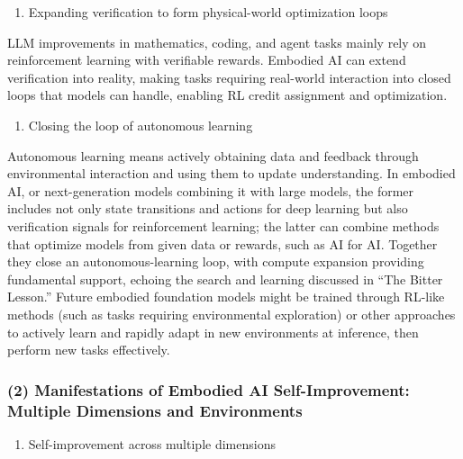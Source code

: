 \begin{enumerate}
\def\labelenumi{\arabic{enumi}.}
\setcounter{enumi}{2}
\tightlist
\item
  Expanding verification to form physical-world optimization loops
\end{enumerate}

LLM improvements in mathematics, coding, and agent tasks mainly rely on reinforcement learning with verifiable rewards. Embodied AI can extend verification into reality, making tasks requiring real-world interaction into closed loops that models can handle, enabling RL credit assignment and optimization.

\begin{enumerate}
\def\labelenumi{\arabic{enumi}.}
\setcounter{enumi}{3}
\tightlist
\item
  Closing the loop of autonomous learning
\end{enumerate}

Autonomous learning means actively obtaining data and feedback through environmental interaction and using them to update understanding. In embodied AI, or next-generation models combining it with large models, the former includes not only state transitions and actions for deep learning but also verification signals for reinforcement learning; the latter can combine methods that optimize models from given data or rewards, such as AI for AI. Together they close an autonomous-learning loop, with compute expansion providing fundamental support, echoing the search and learning discussed in ``The Bitter Lesson.'' Future embodied foundation models might be trained through RL-like methods (such as tasks requiring environmental exploration) or other approaches to actively learn and rapidly adapt in new environments at inference, then perform new tasks effectively.

\hypertarget{manifestations-of-embodied-ai-self-improvement-multiple-dimensions-and-environments}{%
\subsubsection{(2) Manifestations of Embodied AI Self-Improvement: Multiple Dimensions and Environments}\label{manifestations-of-embodied-ai-self-improvement-multiple-dimensions-and-environments}}

\begin{enumerate}
\def\labelenumi{\arabic{enumi}.}
\tightlist
\item
  Self-improvement across multiple dimensions
\end{enumerate}

